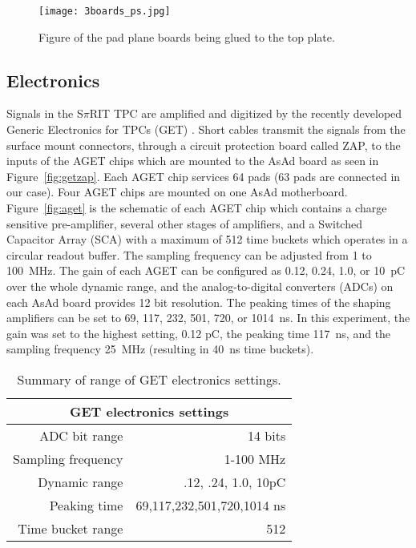 \begin{figure}[!htb]
\centering
\texttt{[image: 3boards\_ps.jpg]}
\caption{Figure of the pad plane boards being glued to the top plate. }
\label{fig:padplane}
\end{figure}


\subsection{Electronics}

Signals in the S$\pi$RIT TPC are amplified and digitized by the recently developed Generic Electronics for TPCs (GET) \cite{get}.  Short cables transmit the signals from the surface mount connectors, through a circuit protection board called ZAP, to the inputs of the AGET chips which are mounted to the AsAd board as seen in Figure~\ref{fig:getzap}. Each AGET chip services 64 pads (63 pads are connected in our case). Four AGET chips are mounted on one AsAd  motherboard. Figure~\ref{fig:aget} is the schematic of each  AGET chip which contains a charge sensitive pre-amplifier, several other stages of amplifiers, and a Switched Capacitor Array (SCA) with a maximum of 512 time buckets which operates in a circular readout buffer. The sampling frequency can be adjusted from 1 to \SI{100}{\mega\hertz}. The gain of each AGET can be configured as 0.12, 0.24, 1.0, or \SI{10}{\pico\coulomb} over the whole dynamic range, and the analog-to-digital converters (ADCs) on each AsAd board provides 12 bit resolution. The peaking times of the shaping amplifiers can be set to 69, 117, 232, 501, 720, or \SI{1014}{\nano\second}. In this experiment, the gain was set to the highest setting, 0.12 \si{\pico\coulomb}, the peaking time \SI{117}{\nano\second}, and the sampling frequency \SI{25}{\mega\hertz} (resulting in \SI{40}{\nano\second} time buckets). 

\begin{table*}[!htb]
\centering
{}
\begin{tabular}{@{}rr@{}}\toprule 
\multicolumn{2}{c}{GET electronics settings}\\
\midrule
ADC bit range       & 14 bits \\
Sampling frequency  & 1-100 MHz \\
Dynamic range       & .12, .24, 1.0, 10pC \\
Peaking time        & 69,117,232,501,720,1014 ns \\
Time bucket range   & 512\\
\bottomrule
\end{tabular}
\caption{Summary of range of GET electronics settings. }
\label{tb:getoverview}
\end{table*}

